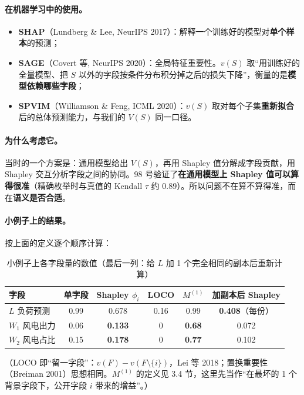 \documentclass[zihao=-4,a4paper]{ctexart}
\begin{document}
\paragraph{在机器学习中的使用。}
\begin{itemize}[leftmargin=*]
  \item \textbf{SHAP}（Lundberg \& Lee, NeurIPS 2017）\cite{lundberg2017}：解释一个训练好的模型对\textbf{单个样本}的预测；
  \item \textbf{SAGE}（Covert 等, NeurIPS 2020）\cite{covert2020}：全局特征重要性。$v(S)$ 取“用训练好的全量模型、把 $S$ 以外的字段按条件分布积分掉之后的损失下降”，衡量的是\textbf{模型依赖哪些字段}；
  \item \textbf{SPVIM}（Williamson \& Feng, ICML 2020）\cite{williamson2020}：$v(S)$ 取对每个子集\textbf{重新拟合}后的总体预测能力，与我们的 $V(S)$ 同一口径。
\end{itemize}

\paragraph{为什么考虑它。}当时的一个方案是：通用模型给出 $V(S)$，再用 Shapley 值分解成字段贡献，用 Shapley 交互分析字段之间的协同。98 号验证了\textbf{在通用模型上 Shapley 值可以算得很准}（精确枚举时与真值的 Kendall $\tau$ 约 0.89）。所以问题不在算不算得准，而在\textbf{语义是否合适}。

\paragraph{小例子上的结果。}按上面的定义逐个顺序计算：

\begin{table}[H]\centering
\caption{小例子上各字段量的数值（最后一列：给 $L$ 加 1 个完全相同的副本后重新计算）}
\small
\begin{tabular}{lccccc}
\toprule
字段 & 单字段 & Shapley $\phi_i$ & LOCO & $M^{(1)}$ & 加副本后 Shapley \\
\midrule
$L$ 负荷预测 & 0.99 & 0.678 & 0.16 & 0.99 & \textbf{0.408}（每份） \\
$W_1$ 风电出力 & 0.06 & \textbf{0.133} & 0 & \textbf{0.68} & 0.072 \\
$W_2$ 风电占比 & 0.15 & \textbf{0.178} & 0 & \textbf{0.77} & 0.102 \\
\bottomrule
\end{tabular}
\end{table}

（LOCO 即“留一字段”：$v(F)-v(F\setminus\{i\})$，Lei 等 2018\cite{lei2018}；置换重要性（Breiman 2001\cite{breiman2001}）思想相同。$M^{(1)}$ 的定义见 3.4 节，这里先当作“在最坏的 1 个背景字段下，公开字段 $i$ 带来的增益”。）
\end{document}
